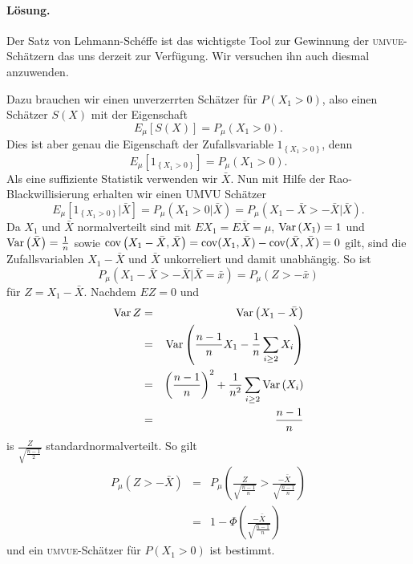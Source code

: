 \paragraph*{Lösung. }   Der Satz von Lehmann-Sch\'effe ist das wichtigste Tool zur Gewinnung
der \textsc{umvue}-Schätzern das uns derzeit zur Verfügung. Wir versuchen ihn auch diesmal anzuwenden. 

Dazu brauchen wir einen unverzerrten Schätzer für $P\left( X_1 >0 \right)$, also einen
Schätzer $S(X)$ mit der Eigenschaft
\begin{equation}
	E_\mu \left[ S(X) \right] = P_\mu(X_1 > 0).
\end{equation}
Dies ist aber genau die Eigenschaft der Zufallsvariable $1_{ \left\{ X_1 > 0 \right\}  }$, denn
\begin{equation}
	E_\mu \left[   1_{ \left\{ X_1 > 0 \right\}  }  \right] = P_\mu( X_1 > 0).
\end{equation}
Als eine suffiziente Statistik verwenden wir $\bar X$. Nun mit Hilfe der Rao-Blackwillisierung
erhalten wir einen \textsc{UMVU} Schätzer
\begin{equation}
	E_\mu \left[ 1_{ \left\{ X_1 > 0 \right\}  } | \bar X \right]
	= P_\mu \left( X_1 > 0 | \bar X \right) 
	= P_\mu \left( X_1 - \bar X > -\bar X | \bar X \right).
\end{equation}
Da $X_1$ und $\bar X$ normalverteilt sind mit $E X_1 = E \bar X = \mu$, 
$\operatorname{Var} \left( X_1 \right)=1$ und $\operatorname{Var}\left( \bar X \right) = \frac{1}{n}$ sowie
$\operatorname{cov} \left( X_1- \bar X, \bar X \right) = \operatorname{cov}(X_1, \bar X) - \operatorname{cov}(\bar X, \bar X) = 0$ gilt, 
sind die Zufallsvariablen $X_1 - \bar X$ und $\bar X$ unkorreliert und damit unabhängig. 
So ist
\begin{equation}
	P_\mu \left( X_1 - \bar X > -\bar X | \bar X = \bar x \right) = P_\mu \left( Z > -\bar x  \right)
\end{equation}
für $Z=X_1 - \bar X$. Nachdem $EZ=0$ und 
\begin{eqnarray}
	\operatorname{Var} Z &=& \operatorname{Var} \left( X_1- \bar X \right) \\
	&=& \operatorname{Var} \left( \frac{n-1}{n} X_1 - \frac{1}{n} \sum_{i\geq 2}^{} X_i  \right) \\
	&=& \left( \frac{n-1}{n} \right)^2 + \frac{1}{n^2} \sum_{i\geq 2}^{} \operatorname{Var} \left( X_i  \right) \\
	&=& \frac{n-1}{ n}
\end{eqnarray}
is $\frac{Z}{\sqrt{\frac{n-1}{2}}}$ standardnormalverteilt. So gilt
\begin{eqnarray}
	P_\mu \left( Z > -\bar X \right) &=& 
	P_\mu \left(  \frac{Z}{ \sqrt{\frac{n-1}{n}} } > \frac{-\bar X}{ \sqrt{\frac{n-1}{n}}   } \right) \\
	&=& 1- \Phi\left( \frac{-\bar X}{ \sqrt{\frac{n-1}{n}}}    \right) 
\end{eqnarray}
und ein \textsc{umvue}-Schätzer für $P\left( X_1 >0 \right)$ ist bestimmt.




